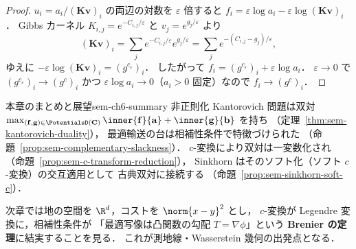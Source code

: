 \begin{proof}
  $u_i = a_i / (\mathbf{K}\mathbf{v})_i$ の両辺の対数を $\varepsilon$ 倍すると
  $f_i = \varepsilon\log a_i - \varepsilon\log(\mathbf{K}\mathbf{v})_i$．
  Gibbs カーネル $K_{i,j} = e^{-C_{i,j}/\varepsilon}$ と
  $v_j = e^{g_j/\varepsilon}$ より
  \[
    (\mathbf{K}\mathbf{v})_i
    = \sum_j e^{-C_{i,j}/\varepsilon} e^{g_j/\varepsilon}
    = \sum_j e^{-(C_{i,j} - g_j)/\varepsilon},
  \]
  ゆえに $-\varepsilon\log(\mathbf{K}\mathbf{v})_i = (g^{c_\varepsilon})_i$．
  したがって $f_i = (g^{c_\varepsilon})_i + \varepsilon\log a_i$．
  $\varepsilon \to 0$ で $(g^{c_\varepsilon})_i \to (g^c)_i$ かつ
  $\varepsilon\log a_i \to 0$（$a_i > 0$ 固定）なので
  $f_i \to (g^c)_i$．
\end{proof}

\begin{remark}{本章のまとめと展望}{sem-ch6-summary}
  非正則化 Kantorovich 問題は双対
  $\max_{(\mathbf{f},\mathbf{g}) \in \PotentialsD(\mathbf{C})}
  \inner{\mathbf{f}}{\mathbf{a}} + \inner{\mathbf{g}}{\mathbf{b}}$ を持ち
  （定理~\ref{thm:sem-kantorovich-duality}），
  最適輸送の台は相補性条件で特徴づけられた
  （命題~\ref{prop:sem-complementary-slackness}）．
  $c$-変換により双対は一変数化され
  （命題~\ref{prop:sem-c-transform-reduction}），
  Sinkhorn はそのソフト化（ソフト $c$-変換）の交互適用として
  古典双対に接続する
  （命題~\ref{prop:sem-sinkhorn-soft-c}）．

  次章では地の空間を $\R^d$，コストを $\norm{x-y}^2$ とし，
  $c$-変換が Legendre 変換に，相補性条件が
  「最適写像は凸関数の勾配 $T = \nabla\phi$」という
  \textbf{Brenier の定理}に結実することを見る．
  これが測地線・Wasserstein 幾何の出発点となる．
\end{remark}
